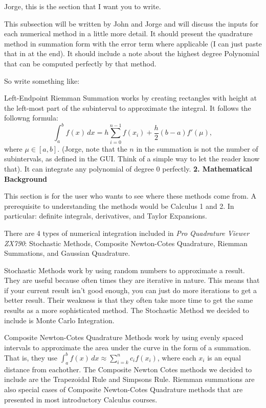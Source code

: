 \documentclass[12pt]{article}
\newcommand{\newLine}{\vspace{5mm}}
\newcommand{\appname}{\textit{Pro Quadrature Viewer ZX790}}
\newcommand{\nextsection}[1]{\newpage\noindent\Large\textbf{#1}\vspace{10mm}\normalsize}
\newcommand{\integral}[3]{\text{$\int^{#2}_{#1} #3\,dx$}}
\newcommand{\summation}[3]{\text{$\sum^{#2}_{#1} #3$}}
\begin{document}
\newLine  Jorge, this is the section that I want you to write.

This subsection will be written by John and Jorge and will discuss the inputs for each numerical method in a little more detail. It should present the quadrature method in summation form with the error term where applicable (I can just paste that in at the end). It should include a note about the highest degree Polynomial that can be computed perfectly by that method. 

So write something like:

\newLine Left-Endpoint Riemman Summation works by creating rectangles with height at the left-most part of the subinterval to approximate the integral. It follows the followng formula:
\begin{equation*} \integral{a}{b}{f(x)} = h\summation{i = 0}{n - 1}{f(x_i)} + \frac{h}{2}(b-a)f'(\mu), \end{equation*}
where $\mu\in[a,b]$. (Jorge, note that the $n$ in the summation is not the number of subintervals, as defined in the GUI. Think of a simple way to let the reader know that). It can integrate any polynomial of degree 0 perfectly. 
\nextsection{2. Mathematical Background}

This section is for the user who wants to see where these methods come from. A prerequisite to understanding the methods would be Calculus 1 and 2. In particular: definite integrals, derivatives, and Taylor Expansions. 

There are 4 types of numerical integration included in \appname: Stochastic Methods, Composite Newton-Cotes Quadrature, Riemman Summations, and Gaussian Quadrature. 

Stochastic Methods work by using random numbers to approximate a result. They are useful because often times they are iterative in nature. This means that if your current result isn't good enough, you can just do more iterations to get a better result. Their weakness is that they often take more time to get the same results as a more sophisticated method. The Stochastic Method we decided to include is Monte Carlo Integration. 

Composite Newton-Cotes Quadrature Methods work by using evenly spaced intervals to approximate the area under the curve in the form of a summation. That is, they use $\integral{a}{b}{f(x)} \approx \summation{i=k}{n}{c_if(x_i)}$, where each $x_i$ is an equal distance from eachother. The Composite Newton Cotes methods we decided to include are the Trapezoidal Rule and Simpsons Rule. Riemman summations are also special cases of Composite Newton-Cotes Quadrature methods that are presented in most introductory Calculus courses. 
\end{document}

